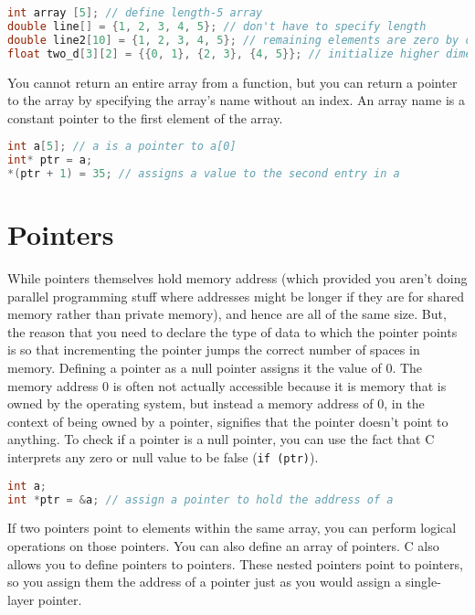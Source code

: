\documentclass[10pt]{article}
\begin{document}
\begin{lstlisting}[language=C]
int array [5]; // define length-5 array
double line[] = {1, 2, 3, 4, 5}; // don't have to specify length
double line2[10] = {1, 2, 3, 4, 5}; // remaining elements are zero by default
float two_d[3][2] = {{0, 1}, {2, 3}, {4, 5}}; // initialize higher dimensional arrays
\end{lstlisting}

You cannot return an entire array from a function, but you can return a pointer to the array by specifying the array's name without an index. An array name is a constant pointer to the first element of the array. 

\begin{lstlisting}[language=C]
int a[5]; // a is a pointer to a[0]
int* ptr = a;
*(ptr + 1) = 35; // assigns a value to the second entry in a
\end{lstlisting}

\section{Pointers}

While pointers themselves hold memory address (which provided you aren't doing parallel programming stuff where addresses might be longer if they are for shared memory rather than private memory), and hence are all of the same size. But, the reason that you need to declare the type of data to which the pointer points is so that incrementing the pointer jumps the correct number of spaces in memory. Defining a pointer as a null pointer assigns it the value of 0. The memory address 0 is often not actually accessible because it is memory that is owned by the operating system, but instead a memory address of 0, in the context of being owned by a pointer, signifies that the pointer doesn't point to anything. To check if a pointer is a null pointer, you can use the fact that C interprets any zero or null value to be false ({\tt if (ptr)}). 

\begin{lstlisting}[language=C]
int a;
int *ptr = &a; // assign a pointer to hold the address of a
\end{lstlisting}

If two pointers point to elements within the same array, you can perform logical operations on those pointers. You can also define an array of pointers. C also allows you to define pointers to pointers. These nested pointers point to pointers, so you assign them the address of a pointer just as you would assign a single-layer pointer. 
\end{document}
